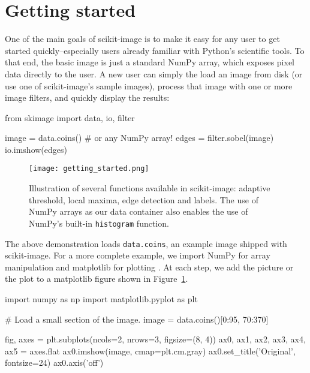 
\section*{Getting started}
  \label{sec:getting-started}

  One of the main goals of scikit-image is to make it easy for any user to get started quickly--especially users already familiar with Python's scientific tools. To that end, the basic image is just a standard NumPy array, which exposes pixel data directly to the user. A new user can simply the load an image from disk (or use one of scikit-image's sample images), process that image with one or more image filters, and quickly display the results:

  \begin{pyverbatim}
    from skimage import data, io, filter

    image = data.coins()  # or any NumPy array!
    edges = filter.sobel(image)
    io.imshow(edges)
  \end{pyverbatim}

  \begin{figure}
    \texttt{[image: getting\_started.png]}

    \caption[Getting started figure]{\label{fig:gettingstarted}Illustration of several functions available in scikit-image: adaptive threshold, local maxima, edge detection and labels. The use of NumPy arrays as our data container also enables the use of NumPy's built-in \texttt{histogram} function.}
  \end{figure}

  The above demonstration loads \texttt{data.coins}, an example image shipped with scikit-image.  For a more complete example, we import NumPy for array manipulation and matplotlib for plotting \citep{numpy,matplotlib}.  At each step, we add the picture or the plot to a matplotlib figure shown in Figure~\ref{fig:gettingstarted}.

  \begin{pyverbatim}
    import numpy as np
    import matplotlib.pyplot as plt

    # Load a small section of the image.
    image = data.coins()[0:95, 70:370]

    fig, axes = plt.subplots(ncols=2, nrows=3,
                             figsize=(8, 4))
    ax0, ax1, ax2, ax3, ax4, ax5  = axes.flat
    ax0.imshow(image, cmap=plt.cm.gray)
    ax0.set_title('Original', fontsize=24)
    ax0.axis('off')
  \end{pyverbatim}

